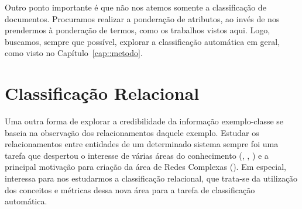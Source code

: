 Outro ponto importante é que não nos atemos somente a classificação de documentos. Procuramos realizar a ponderação de atributos, ao invés de nos prendermos à ponderação de termos, como os trabalhos vistos aqui. Logo, buscamos, sempre que possível, explorar a classificação automática em geral, como visto no Capítulo~\ref{cap::metodo}.




\section{Classificação Relacional}
\label{sec::classificacaografos}

Uma outra forma de explorar a credibilidade da informação exemplo-classe se baseia na observação dos relacionamentos daquele exemplo.
Estudar os relacionamentos entre entidades de um determinado sistema sempre foi uma tarefa que despertou o interesse de várias áreas do conhecimento (\cite{Onody04}, \cite{Shen05}, \cite{Rubinov10}) e a principal motivação para criação da área de Redes Complexas (\cite{Newman03}). Em especial, interessa para nos estudarmos a classificação relacional, que trata-se da utilização dos conceitos e métricas dessa nova área para a tarefa de classificação automática.

